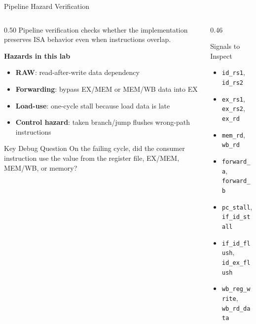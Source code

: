 \documentclass[aspectratio=169,10pt]{beamer}
\begin{document}
\begin{frame}{Pipeline Hazard Verification}
  \begin{columns}[T]
    \begin{column}{0.50\textwidth}
      Pipeline verification checks whether the implementation preserves ISA behavior even when instructions overlap.

      \vspace{0.7em}
      \textbf{Hazards in this lab}
      \begin{itemize}
        \item \textbf{RAW}: read-after-write data dependency
        \item \textbf{Forwarding}: bypass EX/MEM or MEM/WB data into EX
        \item \textbf{Load-use}: one-cycle stall because load data is late
        \item \textbf{Control hazard}: taken branch/jump flushes wrong-path instructions
      \end{itemize}

      \vspace{0.6em}
      \begin{alertblock}{Key Debug Question}
        On the failing cycle, did the consumer instruction use the value from the register file, EX/MEM, MEM/WB, or memory?
      \end{alertblock}
    \end{column}
    \begin{column}{0.46\textwidth}
      \begin{block}{Signals to Inspect}
        \begin{itemize}\small
          \item \texttt{id\_rs1}, \texttt{id\_rs2}
          \item \texttt{ex\_rs1}, \texttt{ex\_rs2}, \texttt{ex\_rd}
          \item \texttt{mem\_rd}, \texttt{wb\_rd}
          \item \texttt{forward\_a}, \texttt{forward\_b}
          \item \texttt{pc\_stall}, \texttt{if\_id\_stall}
          \item \texttt{if\_id\_flush}, \texttt{id\_ex\_flush}
          \item \texttt{wb\_reg\_write}, \texttt{wb\_rd\_data}
        \end{itemize}
      \end{block}
    \end{column}
  \end{columns}
\end{frame}
\end{document}
